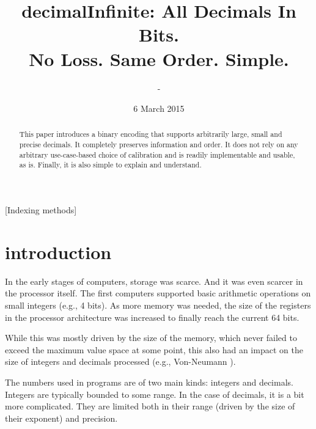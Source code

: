 \documentclass{acm_proc_article-sp}
\begin{document}
\title{decimalInfinite: All Decimals In Bits.\\ No Loss. Same Order. Simple.}


\author{
\alignauthor
-\\
}
\date{6 March 2015}
\maketitle

\begin{abstract}
This paper introduces a binary encoding that supports arbitrarily large, small and precise decimals. It completely preserves information and order. It does not rely on any arbitrary use-case-based choice of calibration and is readily implementable and usable, as is. Finally, it is also simple to explain and understand.
\end{abstract}

[Indexing methods]



\section{introduction}
In the early stages of computers, storage was scarce. And it was even scarcer in the processor itself. The first computers supported basic arithmetic operations on small integers (e.g., 4 bits). As more memory was needed, the size of the registers in the processor architecture was increased to finally reach the current 64 bits.

While this was mostly driven by the size of the memory, which never failed to exceed the maximum value space at some point, this also had an impact on the size of integers and decimals processed (e.g., Von-Neumann \cite{VonNeumann1946}).

The numbers used in programs are of two main kinds: integers and decimals. Integers are typically bounded to some range. In the case of decimals, it is a bit more complicated. They are limited both in their range (driven by the size of their exponent) and precision.
\end{document}
